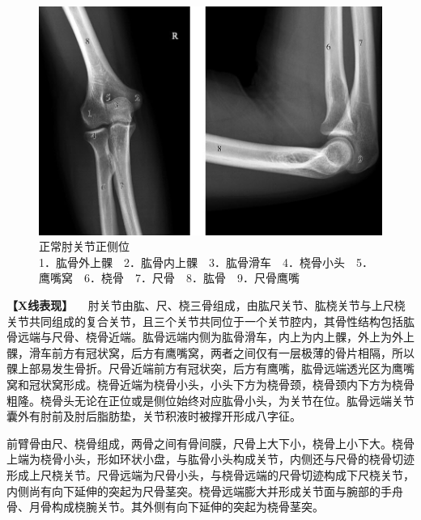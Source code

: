 \begin{figure}[!htbp]
 \centering
 \includegraphics{./images/Image00004.jpg}
 \captionsetup{justification=centering}
 \caption{正常肘关节正侧位\\{\small 1．肱骨外上髁　2．肱骨内上髁　3．肱骨滑车　4．桡骨小头　5．鹰嘴窝　6．桡骨　7．尺骨　8．肱骨　9．尺骨鹰嘴}}
 \label{fig2-1-2}
  \end{figure} 

\textbf{【X线表现】}
　肘关节由肱、尺、桡三骨组成，由肱尺关节、肱桡关节与上尺桡关节共同组成的复合关节，且三个关节共同位于一个关节腔内，其骨性结构包括肱骨远端与尺骨、桡骨近端。肱骨远端内侧为肱骨滑车，内上为内上髁，外上为外上髁，滑车前方有冠状窝，后方有鹰嘴窝，两者之间仅有一层极薄的骨片相隔，所以髁上部易发生骨折。尺骨近端前方有冠状突，后方有鹰嘴，肱骨远端透光区为鹰嘴窝和冠状窝形成。桡骨近端为桡骨小头，小头下方为桡骨颈，桡骨颈内下方为桡骨粗隆。桡骨头无论在正位或是侧位始终对应肱骨小头，为关节在位。肱骨远端关节囊外有肘前及肘后脂肪垫，关节积液时被撑开形成八字征。

前臂骨由尺、桡骨组成，两骨之间有骨间膜，尺骨上大下小，桡骨上小下大。桡骨上端为桡骨小头，形如环状小盘，与肱骨小头构成关节，内侧还与尺骨的桡骨切迹形成上尺桡关节。尺骨远端为尺骨小头，与桡骨远端的尺骨切迹构成下尺桡关节，内侧尚有向下延伸的突起为尺骨茎突。桡骨远端膨大并形成关节面与腕部的手舟骨、月骨构成桡腕关节。其外侧有向下延伸的突起为桡骨茎突。

